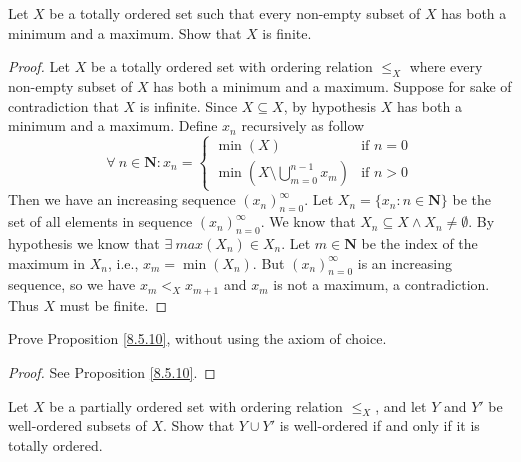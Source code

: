 \begin{exercise}\label{ex 8.5.9}
    Let \(X\) be a totally ordered set such that every non-empty subset of \(X\) has both a minimum and a maximum.
    Show that \(X\) is finite.
\end{exercise}

\begin{proof}
    Let \(X\) be a totally ordered set with ordering relation \(\leq_X\) where every non-empty subset of \(X\) has both a minimum and a maximum.
    Suppose for sake of contradiction that \(X\) is infinite.
    Since \(X \subseteq X\), by hypothesis \(X\) has both a minimum and a maximum.
    Define \(x_n\) recursively as follow
    \[
        \forall\ n \in \mathbf{N} : x_n = \begin{cases}
            \min(X)                                       & \text{if } n = 0 \\
            \min(X \setminus \bigcup_{m = 0}^{n - 1} x_m) & \text{if } n > 0
        \end{cases}
    \]
    Then we have an increasing sequence \((x_n)_{n = 0}^\infty\).
    Let \(X_n = \{x_n : n \in \mathbf{N}\}\) be the set of all elements in sequence \((x_n)_{n = 0}^\infty\).
    We know that \(X_n \subseteq X \land X_n \neq \emptyset\).
    By hypothesis we know that \(\exists\ max(X_n) \in X_n\).
    Let \(m \in \mathbf{N}\) be the index of the maximum in \(X_n\), i.e., \(x_m = \min(X_n)\).
    But \((x_n)_{n = 0}^\infty\) is an increasing sequence, so we have \(x_m <_X x_{m + 1}\) and \(x_m\) is not a maximum, a contradiction.
    Thus \(X\) must be finite.
\end{proof}

\begin{exercise}\label{ex 8.5.10}
    Prove Proposition \ref{8.5.10}, without using the axiom of choice.
\end{exercise}

\begin{proof}
    See Proposition \ref{8.5.10}.
\end{proof}

\begin{exercise}\label{ex 8.5.11}
    Let \(X\) be a partially ordered set with ordering relation \(\leq_X\), and let \(Y\) and \(Y'\) be well-ordered subsets of \(X\).
    Show that \(Y \cup Y'\) is well-ordered if and only if it is totally ordered.
\end{exercise}

